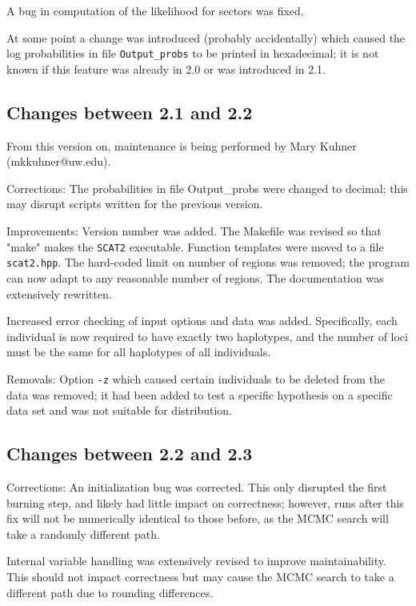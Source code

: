 \documentclass[10pt,titlepage,times,letterpaper]{article}
\def\SCAT{{\tt SCAT2} }
\begin{document}
A bug in computation of the likelihood for sectors was fixed.

At some point a change was introduced (probably accidentally) which caused the log probabilities
in file {\tt Output\_probs} to be printed in hexadecimal; it is not known
if this feature was already in 2.0 or was introduced in 2.1.

\subsection{Changes between 2.1 and 2.2}

From this version on, maintenance is being performed by Mary Kuhner
(mkkuhner@uw.edu).

Corrections: The probabilities in file Output\_probs were
changed to decimal; this may disrupt scripts written for the previous
version. 

Improvements:  
Version number was added. 
The Makefile was revised so that "make" makes the \SCAT executable.
Function templates were moved to a file {\tt scat2.hpp}.
The hard-coded limit on number of regions was removed; the program can
now adapt to any reasonable number of regions.
The documentation was extensively rewritten.

Increased error checking of input options and data was added.  Specifically,
each individual is now required to have exactly two haplotypes, and the
number of loci must be the same for all haplotypes of all individuals.

Removals:
Option {\tt -z} which caused certain individuals to be deleted
from the data was removed; it had been added to test a specific hypothesis
on a specific data set and was not suitable for distribution.


\subsection{Changes between 2.2 and 2.3}

Corrections:  An initialization bug was corrected.  This only disrupted
the first burning step, and likely had little impact on correctness; however,
runs after this fix will not be numerically identical to those before,
as the MCMC search will take a randomly different path.

Internal variable handling was extensively revised to improve maintainability.
This should not impact correctness but may cause the MCMC search to take a
different path due to rounding differences.
\end{document}
